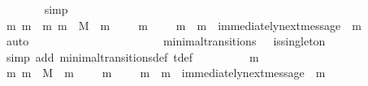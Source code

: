 \begin{isabellebody}
\ \ \ \ \ \ \isamarkupfalse%
\ simp\isanewline
\ \ \ \ \isamarkupfalse%
\ \isamarkupfalse%
\ m{}\ m{}\ \ {\isachardoublequoteopen}{\isacharbraceleft}m{}{\isacharcomma}\ m{}{\isacharbraceright}\ {\isasymsubseteq}\ M\ {\isasymand}\ m{}\ {\isasymin}\ {\isasymsigma}{\isacharprime}{\isacharminus}\ {\isasymsigma}\ {\isasymand}\ m{}\ {\isasymin}\ {\isasymsigma}{\isacharprime}{\isacharminus}\ {\isasymsigma}\ {\isasymand}\ m{}\ {\isasymnoteq}\ m{}\ {\isasymand}\ immediately{\isacharunderscore}next{\isacharunderscore}message\ {\isacharparenleft}{\isasymsigma}{\isacharcomma}\ m{}{\isacharparenright}{\isachardoublequoteclose}\isanewline
\ \ \ \ \ \ \isamarkupfalse%
\ auto\isanewline
\ \ \ \ \isamarkupfalse%
\ {\isachardoublequoteopen}{\isasymsigma}\ {\isasymin}\ {\isasymSigma}\ {\isasymand}\ {\isasymsigma}{\isacharprime}\ {\isasymin}\ {\isasymSigma}{\isachardoublequoteclose}\isanewline
\ \ \ \ \ \ \isamarkupfalse%
\ {\isacartoucheopen}{\isacharparenleft}{\isasymsigma}{\isacharcomma}\ {\isasymsigma}{\isacharprime}{\isacharparenright}\ {\isasymin}\ minimal{\isacharunderscore}transitions\ {\isasymand}\ {\isasymnot}\ is{\isacharunderscore}singleton\ {\isacharparenleft}{\isasymsigma}{\isacharprime}\ {\isacharminus}\ {\isasymsigma}{\isacharparenright}{\isacartoucheclose}\isanewline
\ \ \ \ \ \ \isamarkupfalse%
\ {\isacharparenleft}simp\ add{\isacharcolon}\ minimal{\isacharunderscore}transitions{\isacharunderscore}def\ {\isasymSigma}t{\isacharunderscore}def{\isacharparenright}\isanewline
\ \ \ \ \isamarkupfalse%
\ \isamarkupfalse%
\ {\isachardoublequoteopen}{\isasymsigma}\ {\isasymunion}\ {\isacharbraceleft}m{}{\isacharbraceright}\ {\isasymin}\ {\isasymSigma}{\isachardoublequoteclose}\isanewline
\ \ \ \ \ \ \isamarkupfalse%
\ {\isacartoucheopen}{\isacharbraceleft}m{}{\isacharcomma}\ m{}{\isacharbraceright}\ {\isasymsubseteq}\ M\ {\isasymand}\ m{}\ {\isasymin}\ {\isasymsigma}{\isacharprime}{\isacharminus}\ {\isasymsigma}\ {\isasymand}\ m{}\ {\isasymin}\ {\isasymsigma}{\isacharprime}{\isacharminus}\ {\isasymsigma}\ {\isasymand}\ m{}\ {\isasymnoteq}\ m{}\ {\isasymand}\ immediately{\isacharunderscore}next{\isacharunderscore}message\ {\isacharparenleft}{\isasymsigma}{\isacharcomma}\ m{}{\isacharparenright}{\isacartoucheclose}\isanewline

\end{isabellebody}
